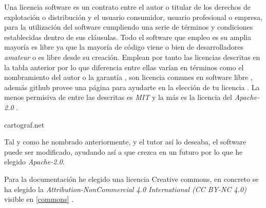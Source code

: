 Una licencia software es un contrato entre el autor o titular de los derechos de explotación o distribución y el usuario consumidor, usuario profesional o empresa, para la utilización del software cumpliendo una serie de términos y condiciones establecidas dentro de sus cláusulas. Todo el software que empleo es su amplia mayoría es libre ya que la mayoría de código viene o bien de desarrolladores \emph{amateur} o es libre desde su creación. Emplean por tanto las licencias descritas en la tabla anterior por lo que diferencia entre ellas varían en términos como el nombramiento del autor o la garantía , son licencia comunes en software libre \cite{githublicense} , además github provee una página para ayudarte en la elección de tu licencia \citep{githubchoose}. La menos permisiva de entre las descritas es \emph{MIT} \citep{mit}  y la más es la licencia del  \emph{Apache-2.0} \cite{apache}.


cartograf.net

Tal y como he nombrado anteriormente, y el tutor así lo deseaba, el software puede ser modificado, ayudando así a que crezca en un futuro
por lo que he elegido \emph{Apache-2.0}. 


Para la documentación he elegido una licencia Creative commons, en concreto se ha elegido la \emph{Attribution-NonCommercial 4.0 International (CC BY-NC 4.0)} visible en \ref{commons} .


\label{commons}



